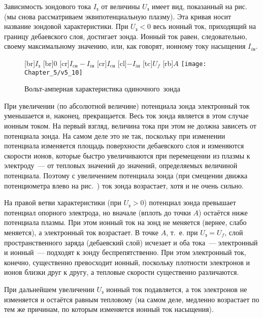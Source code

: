 Зависимость зондового тока $I_\text{з}$ от величины $U_\text{з}$ имеет вид,
показанный на рис.~ (мы снова рассматриваем
эквипотенциальную плазму). Эта кривая носит название зондовой характеристики.
При $U_\text{з}<0$ весь ионный ток, приходящий на
границу дебаевского слоя, достигает зонда. Ионный ток равен, следовательно,
своему максимальному значению, или, как
говорят, ионному току насыщения $I_{i\text{н}}$.

\begin{wrapfigure}{o}{0.5\textwidth}
	[br]{$I_з$}
	[br]{0}
	[cr]{$I_{eн}-I_{iн}$}
	[cr]{$I_{eн}$}
	[cl]{$-I_{iн}$}
	[tc]{$U_f$}
	[rb]{$A$}
	\texttt{[image: Chapter\_5/v5\_10]}
	\caption{Вольт-амперная характеристика одиночного~зонда}
\end{wrapfigure}

При увеличении (по абсолютной величине) потенциала зонда электронный ток
уменьшается и, наконец, прекращается. Весь ток зонда является в этом случае
ионным током. На первый взгляд, величина
тока при этом не должна зависеть от потенциала зонда. На самом деле это не так,
поскольку при изменении потенциала
изменяется площадь поверхности дебаевского слоя и изменяются скорости ионов,
которые быстро увеличиваются при
перемещении из плазмы к электроду~--- от тепловых значений до значений,
определяемых величиной потенциала. Поэтому с
увеличением потенциала зонда (при смещении движка потенциометра влево на
рис.~) ток зонда возрастает, хотя и не
очень
сильно.

На правой ветви характеристики (при $U_\text{з}>0$) потенциал зонда превышает
потенциал опорного электрода, но вначале (вплоть
до точки $A$) остаётся ниже потенциала плазмы. При этом ионный ток на зонд не
меняется (вернее, слабо меняется), а
электронный ток возрастает. В точке $A$, т.~е. при $U_\text{з}=U_f$, слой
пространственного заряда (дебаевский слой) исчезает и
оба тока~--- электронный и ионный~--- подходят к зонду беспрепятственно. При
этом электронный ток, конечно, существенно
превосходит ионный, поскольку плотности электронов и ионов близки друг к другу,
а тепловые скорости существенно
различаются.

При дальнейшем увеличении $U_з$ ионный ток подавляется, а ток электронов не
изменяется и остаётся равным тепловому (на
самом деле, медленно возрастает по тем же причинам, по которым изменяется ионный
ток насыщения).

